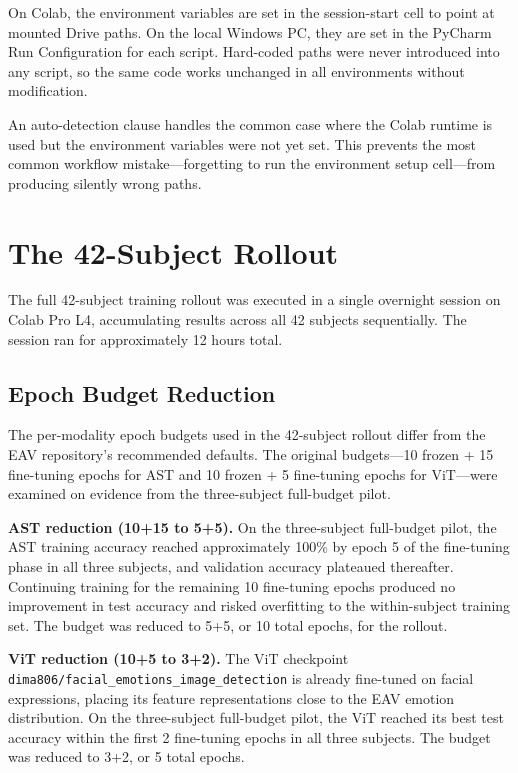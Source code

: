 On Colab, the environment variables are set in the session-start cell to point at mounted Drive paths. On the local Windows PC, they are set in the PyCharm Run Configuration for each script. Hard-coded paths were never introduced into any script, so the same code works unchanged in all environments without modification.

An auto-detection clause handles the common case where the Colab runtime is used but the environment variables were not yet set. This prevents the most common workflow mistake---forgetting to run the environment setup cell---from producing silently wrong paths.

\section{The 42-Subject Rollout}
The full 42-subject training rollout was executed in a single overnight session on Colab Pro L4, accumulating results across all 42 subjects sequentially. The session ran for approximately 12 hours total.

\subsection{Epoch Budget Reduction}
The per-modality epoch budgets used in the 42-subject rollout differ from the EAV repository's recommended defaults. The original budgets---10 frozen + 15 fine-tuning epochs for AST and 10 frozen + 5 fine-tuning epochs for ViT---were examined on evidence from the three-subject full-budget pilot.

\textbf{AST reduction (10+15 to 5+5).} On the three-subject full-budget pilot, the AST training accuracy reached approximately 100\% by epoch 5 of the fine-tuning phase in all three subjects, and validation accuracy plateaued thereafter. Continuing training for the remaining 10 fine-tuning epochs produced no improvement in test accuracy and risked overfitting to the within-subject training set. The budget was reduced to 5+5, or 10 total epochs, for the rollout.

\textbf{ViT reduction (10+5 to 3+2).} The ViT checkpoint \texttt{dima806/facial\_emotions\_image\_detection} is already fine-tuned on facial expressions, placing its feature representations close to the EAV emotion distribution. On the three-subject full-budget pilot, the ViT reached its best test accuracy within the first 2 fine-tuning epochs in all three subjects. The budget was reduced to 3+2, or 5 total epochs.

